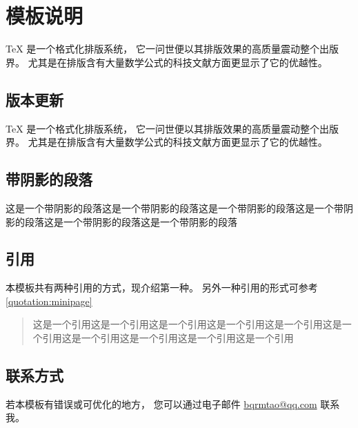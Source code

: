 % 
% 
% 
% 
% 
% 

\chapter{模板说明}
\label{chapter:template-info}

\TeX{} \index{\TeX} 是一个格式化排版系统，
它一问世便以其排版效果的高质量震动整个出版界。
尤其是在排版含有大量数学公式的科技文献方面更显示了它的优越性。

\section{版本更新}

\TeX{} \index{\TeX} 是一个格式化排版系统，
它一问世便以其排版效果的高质量震动整个出版界。
尤其是在排版含有大量数学公式的科技文献方面更显示了它的优越性。

\section{带阴影的段落}
\begin{shaded}
这是一个带阴影的段落这是一个带阴影的段落这是一个带阴影的段落这是一个带阴影的段落这是一个带阴影的段落这是一个带阴影的段落
\end{shaded}

\section{引用}\label{sec:quotation}
本模板共有两种引用的方式，现介绍第一种。
另外一种引用的形式可参考 \ref{quotation:minipage}
\begin{quote}\label{quotation:quote}
这是一个引用这是一个引用这是一个引用这是一个引用这是一个引用这是一个引用这是一个引用这是一个引用这是一个引用这是一个引用
\end{quote}

\section{联系方式}
若本模板有错误或可优化的地方，
您可以通过电子邮件 \href{mailto:bqrmtao@qq.com}{bqrmtao@qq.com} 联系我。